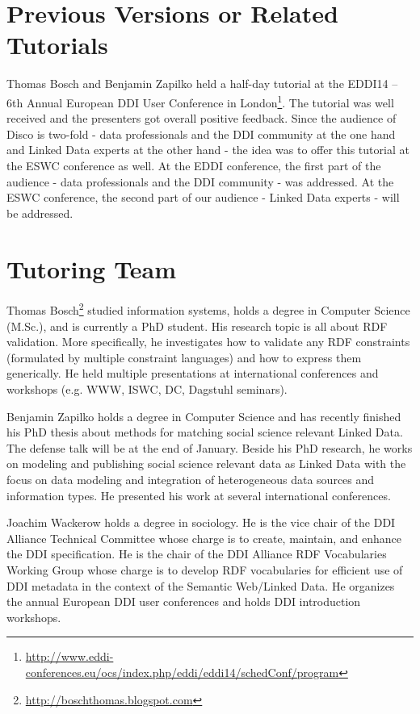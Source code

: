 \documentclass{llncs}
\begin{document}
\section{Previous Versions or Related Tutorials}

Thomas Bosch and Benjamin Zapilko held a half-day tutorial at the EDDI14 – 6th Annual European DDI User Conference in London\footnote{\url{http://www.eddi-conferences.eu/ocs/index.php/eddi/eddi14/schedConf/program}}.
The tutorial was well received and the presenters got overall positive feedback. Since the audience of Disco is two-fold - data professionals and the DDI community at the one hand and Linked Data experts at the other hand - the idea was to offer this tutorial at the ESWC conference as well.
At the EDDI conference, the first part of the audience - data professionals and the DDI community - was addressed.
At the ESWC conference, the second part of our audience - Linked Data experts - will be addressed.

\section{Tutoring Team}


Thomas Bosch\footnote{\url{http://boschthomas.blogspot.com}} studied information systems, holds a degree in Computer Science (M.Sc.), and is currently a PhD student.
His research topic is all about RDF validation.
More specifically, he investigates how to validate any RDF constraints (formulated by multiple constraint languages) and how to express them generically. 
He held multiple presentations at international conferences and workshops (e.g. WWW, ISWC, DC, Dagstuhl seminars). 

Benjamin Zapilko holds a degree in Computer Science and has recently finished his PhD thesis about methods for matching social science relevant Linked Data. The defense talk will be at the end of January. Beside his PhD research, he works on modeling and publishing social science relevant data as Linked Data with the focus on data modeling and integration of heterogeneous data sources and information types. He presented his work at several international conferences.

Joachim Wackerow holds a degree in sociology. 
He is the vice chair of the DDI Alliance Technical Committee whose charge is to create, maintain, and enhance the DDI specification.
He is the chair of the DDI Alliance RDF Vocabularies Working Group whose charge is to develop RDF vocabularies for efficient use of DDI metadata in the context of the Semantic Web/Linked Data.
He organizes the annual European DDI user conferences and holds DDI introduction workshops.

{}

\setcounter{tocdepth}{1}
\end{document}
